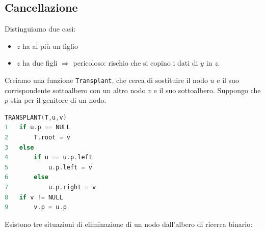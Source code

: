 \subsection{Cancellazione}
Distinguiamo due casi:
\begin{itemize}
    \item $z$ ha al più un figlio
    \item $z$ ha due figli $\Rightarrow$ pericoloso: rischio che si copino i dati di $y$ in $z$.
\end{itemize}
Creiamo una funzione \verb|Transplant|, che cerca di sostituire il nodo $u$ e il suo corrispondente sottoalbero con un altro nodo $v$ e il suo sottoalbero. Suppongo che $p$ stia per il genitore di un nodo.
\begin{mdframed}
\begin{lstlisting}[language=C]
TRANSPLANT(T,u,v)
1   if u.p == NULL
2       T.root = v
3   else
4       if u == u.p.left
5           u.p.left = v
6       else
7           u.p.right = v
8   if v != NULL
9       v.p = u.p
\end{lstlisting}
\end{mdframed}
Esistono tre situazioni di eliminazione di un nodo dall'albero di ricerca binario:
